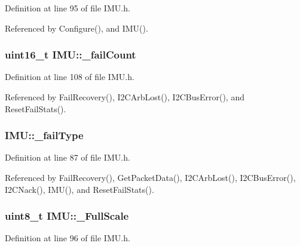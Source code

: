 Definition at line 95 of file IMU.h.



Referenced by Configure(), and IMU().

\hypertarget{class_i_m_u_a1e646aa38b84721fc650ef5d3388cc14}{
\subsubsection[{\_\-failCount}]{\setlength{\rightskip}{0pt plus 5cm}uint16\_\-t {\bf IMU::\_\-failCount}}}
\label{class_i_m_u_a1e646aa38b84721fc650ef5d3388cc14}


Definition at line 108 of file IMU.h.



Referenced by FailRecovery(), I2CArbLost(), I2CBusError(), and ResetFailStats().

\hypertarget{class_i_m_u_a39ed63b67b50c67520c5f8e5a2c26b26}{
\subsubsection[{\_\-failType}]{ {\bf IMU::\_\-failType}}}
\label{class_i_m_u_a39ed63b67b50c67520c5f8e5a2c26b26}


Definition at line 87 of file IMU.h.



Referenced by FailRecovery(), GetPacketData(), I2CArbLost(), I2CBusError(), I2CNack(), IMU(), and ResetFailStats().

\hypertarget{class_i_m_u_a059c02011a10bb90aecc9692ed345771}{
\subsubsection[{\_\-FullScale}]{\setlength{\rightskip}{0pt plus 5cm}uint8\_\-t {\bf IMU::\_\-FullScale}}}
\label{class_i_m_u_a059c02011a10bb90aecc9692ed345771}


Definition at line 96 of file IMU.h.



